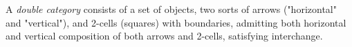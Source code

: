 A \emph{double category} consists of a set of objects, two sorts of arrows ("horizontal" and "vertical"), and 2-cells (squares) with boundaries, admitting both horizontal and vertical composition of both arrows and 2-cells, satisfying interchange.
